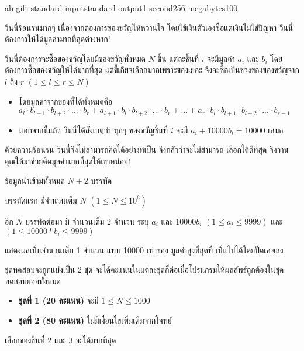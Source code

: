 \documentclass[11pt,a4paper]{article}
\begin{document}
\begin{problem}{ab gift }{standard input}{standard output}{1 second}{256 megabytes}{100}

วินนี่ร้อนรนมากๆ เนื่องจากต้องการของขวัญให้หวานใจ โดยใช้เงินตัวเองซื้อแต่เงินไม่ใช่ปัญหา วินนี่ต้องการให้ได้มูลค่ามากที่สุดต่างหาก!

วินนี่ต้องการจะซื้อของขวัญโดยมีของขวัญทั้งหมด $N$ ชิ้น แต่ละชิ้นที่ $i$ จะมีมูลค่า $a_i$ และ $b_i$
โดยต้องการซื้อของขวัญให้ได้มากที่สุด แต่ขี้เกียจเลือกมากเพราะของเยอะ จึงจะซื้อเป็นช่วงของของขวัญจาก $l$ ถึง $r$ $( 1 \leq l \leq r \leq N )$ 
\begin{itemize}

\item โดยมูลค่าจากของที่ได้ทั้งหมดคือ  $a_l \cdot b_{l+1} \cdot b_{l+2} \cdot ... \cdot b_r +
a_{l+1} \cdot b_l \cdot b_{l+2} \cdot ... \cdot b_r +...+ a_r \cdot b_l \cdot b_{l+1} \cdot b_{l+2} \cdot ... \cdot b_{r-1}$ 
\item นอกจากนี้แล้ว วินนี่ได้สังเกตุว่า ทุกๆ ของขวัญชิ้นที่ $i$ จะมี $a_i+10000b_i = 10000$ เสมอ
\end{itemize}

ด้วยความร้อนรน วินนี่จึงไม่สามารถคิดได้อย่างที่เป็น จึงกลัวว่าจะไม่สามารถ เลือกได้ดีที่สุด จึงวานคุณให้มาช่วยคิดมูลค่ามากที่สุดให้เขาหน่อย! 

\InputFile
ข้อมูลนำเข้ามีทั้งหมด $N+2$ บรรทัด

บรรทัดแรก มีจำนวนเต็ม $N$ $( 1 \leq N \leq 10^6 )$ 

อีก $N$ บรรทัดต่อมา มี จำนวนเต็ม 2 จำนวน ระบุ $a_i$ และ $10000b_i$
$( 1 \leq a_i \leq 9999 )$ และ $( 1 \leq 10000 * b_i \leq 9999 ) $

\OutputFile
แสดงผลเป็นจำนวนเต็ม 1 จำนวน แทน 10000 เท่าของ มูลค่าสูงที่สุดที่ เป็นไปได้โดยปัดเศษลง

\Scoring
ชุดทดสอบจะถูกแบ่งเป็น 2 ชุด จะได้คะแนนในแต่ละชุดก็ต่อเมื่อโปรแกรมให้ผลลัพธ์ถูกต้องในชุดทดสอบย่อยทั้งหมด

\begin{itemize}

\item \textbf{ชุดที่ 1  (20 คะแนน)} จะมี $1 \leq N \leq 1000$

\item \textbf{ชุดที่ 2 (80 คะแนน)} ไม่มีเงื่อนไขเพิ่มเติมจากโจทย์

\end{itemize}

\Example

\begin{example}
%
\end{example}

\Note

เลือกของชิ้นที่ 2 และ 3 จะได้มากที่สุด

\end{problem}
\end{document}

